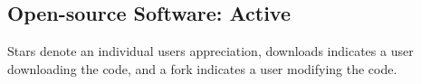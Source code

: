 \documentclass[10pt,colorlinks=true,urlcolor=blue]{moderncv}
\begin{document}

\subsection{Open-source Software: Active}
     
Stars denote an individual users appreciation, downloads indicates a user downloading the code, and a fork indicates a user modifying the code.
\end{document}
